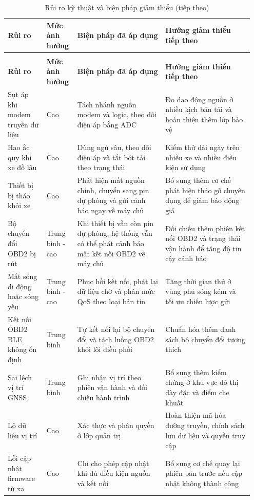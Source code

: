 \documentclass[a4paper]{extarticle}
\newcommand{\thesissettableid}[2]{%
  \renewcommand{\thetable}{#1}%
  \renewcommand{\theHtable}{#2}%
}
\begin{document}
{\thesissettableid{5.3}{condensed-bang-5-3-rui-ro-ky-thuat-va-bien-phap-giam-thieu}
\def\LTcaptype{table}
\begin{longtable}{|L{0.150\linewidth}|L{0.115\linewidth}|L{0.340\linewidth}|L{0.345\linewidth}|}
\caption{Rủi ro kỹ thuật và biện pháp giảm thiểu}\label{tab:condensed-bang-5-3-rui-ro-ky-thuat-va-bien-phap-giam-thieu}\\
\hline
\textbf{Rủi ro} & \textbf{Mức ảnh hưởng} & \textbf{Biện pháp đã áp dụng} & \textbf{Hướng giảm thiểu tiếp theo} \\
\hline
\endfirsthead
\caption[]{Rủi ro kỹ thuật và biện pháp giảm thiểu (tiếp theo)}\\
\hline
\textbf{Rủi ro} & \textbf{Mức ảnh hưởng} & \textbf{Biện pháp đã áp dụng} & \textbf{Hướng giảm thiểu tiếp theo} \\
\hline
\endhead
\endfoot
\endlastfoot
Sụt áp khi modem truyền dữ liệu & Cao & Tách nhánh nguồn modem và logic, theo dõi điện áp bằng ADC & Đo dao động nguồn ở nhiều kịch bản tải và hoàn thiện thêm lớp bảo vệ \\\hline
Hao ắc quy khi xe đỗ lâu & Cao & Dùng ngủ sâu, theo dõi điện áp và tắt bớt tải theo trạng thái & Kiểm thử dài ngày trên nhiều xe và nhiều điều kiện sử dụng \\\hline
Thiết bị bị tháo khỏi xe & Cao & Phát hiện mất nguồn chính, chuyển sang pin dự phòng và gửi cảnh báo ngay về máy chủ & Bổ sung thêm cơ chế phát hiện tháo gỡ chuyên dụng để giảm báo động giả \\\hline
Bộ chuyển đổi OBD2 bị rút & Trung bình - cao & Khi thiết bị vẫn còn pin dự phòng, hệ thống vẫn có thể phát cảnh báo mất kết nối OBD2 về máy chủ & Đối chiếu thêm phiên kết nối OBD2 và trạng thái vận hành để tăng độ tin cậy cảnh báo \\\hline
Mất sóng di động hoặc sóng yếu & Trung bình - cao & Phục hồi kết nối, phát lại dữ liệu chờ và phân mức QoS theo loại bản tin & Tăng thời gian thử ở vùng phủ sóng kém và tối ưu chiến lược gửi \\\hline
Kết nối OBD2 BLE không ổn định & Trung bình & Tự kết nối lại bộ chuyển đổi và tách luồng OBD2 khỏi lõi điều phối & Chuẩn hóa thêm danh sách bộ chuyển đổi tương thích \\\hline
Sai lệch vị trí GNSS & Trung bình & Ghi nhận vị trí theo phiên vận hành và đối chiếu hành trình & Bổ sung thêm kiểm chứng ở khu vực đô thị dày đặc và điểm che khuất \\\hline
Lộ dữ liệu vị trí & Cao & Xác thực và phân quyền ở lớp quản trị & Hoàn thiện mã hóa đường truyền, chính sách lưu dữ liệu và quyền truy cập \\\hline
Lỗi cập nhật firmware từ xa & Cao & Chỉ cho phép cập nhật khi đủ điều kiện nguồn và kết nối & Bổ sung cơ chế quay lại phiên bản trước nếu cập nhật không thành công \\\hline
\end{longtable}
}
\end{document}
